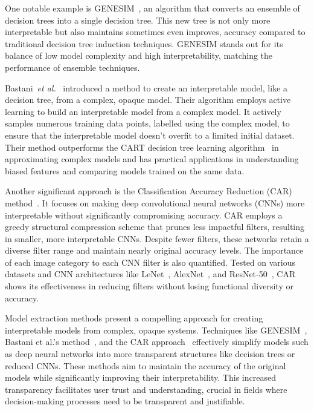 One notable example is GENESIM~\cite{VandewieleJOTH16}, an algorithm that converts an ensemble of decision trees into a single decision tree. This new tree is not only more interpretable but also maintains sometimes even improves, accuracy compared to traditional decision tree induction techniques. GENESIM stands out for its balance of low model complexity and high interpretability, matching the performance of ensemble techniques.

Bastani~\textit{et al.}~\cite{BastaniKB17a} introduced a method to create an interpretable model, like a decision tree, from a complex, opaque model. Their algorithm employs active learning to build an interpretable model from a complex model. It actively samples numerous training data points, labelled using the complex model, to ensure that the interpretable model doesn't overfit to a limited initial dataset. Their method outperforms the CART decision tree learning algorithm~\cite{BreimanFOS84} in approximating complex models and has practical applications in understanding biased features and comparing models trained on the same data.

Another significant approach is the Classification Accuracy Reduction (CAR) method~\cite{VandewieleJOTH16}. It focuses on making deep convolutional neural networks (CNNs) more interpretable without significantly compromising accuracy. CAR employs a greedy structural compression scheme that prunes less impactful filters, resulting in smaller, more interpretable CNNs. Despite fewer filters, these networks retain a diverse filter range and maintain nearly original accuracy levels. The importance of each image category to each CNN filter is also quantified. Tested on various datasets and CNN architectures like LeNet~\cite{LeCunBDHHHJ89}, AlexNet~\cite{KrizhevskySH12}, and ResNet-50~\cite{HeZRS15}, CAR shows its effectiveness in reducing filters without losing functional diversity or accuracy.

Model extraction methods present a compelling approach for creating interpretable models from complex, opaque systems. Techniques like GENESIM~\cite{VandewieleJOTH16}, Bastani et al.'s method~\cite{BastaniKB17a}, and the CAR approach~\cite{VandewieleJOTH16} effectively simplify models such as deep neural networks into more transparent structures like decision trees or reduced CNNs. These methods aim to maintain the accuracy of the original models while significantly improving their interpretability. This increased transparency facilitates user trust and understanding, crucial in fields where decision-making processes need to be transparent and justifiable.

